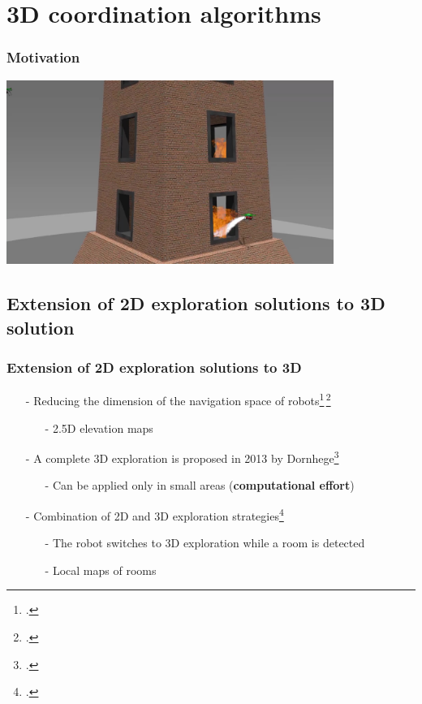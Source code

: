 \section{3D coordination algorithms}

\begin{frame}
	\frametitle{Motivation}
	\centering
	\href{mbzirc_video.mp4}{\includegraphics[width=0.8\textwidth]{figures/mbzirc_screen.jpg}}
	
\end{frame}

\subsection{Extension of 2D exploration solutions to 3D solution}
\begin{frame}
     \frametitle{Extension of 2D exploration solutions to 3D}
     \begin{itemize}
     	\item[-] Reducing the dimension of the navigation space of robots\footcite{Bachrach2009}$\,$\footcite{Surmann2003}
     	\begin{itemize}
     		\item[-] 2.5D elevation maps 
     	\end{itemize}	
     	\item[-] A complete 3D exploration is proposed in 2013 by Dornhege\footcite{Dornhege2013}
     	 	\begin{itemize}
     			\item[-] Can be applied only in small areas (\textbf{computational effort})
     	 	\end{itemize}
      	\item[-] Combination of 2D and 3D exploration strategies\footcite{Maurovic2014}
      	\begin{itemize}
      		\item[-] The robot switches to 3D exploration while a room is detected
      		\item[-] Local maps of rooms
      	\end{itemize}		
     \end{itemize}   
\end{frame}

